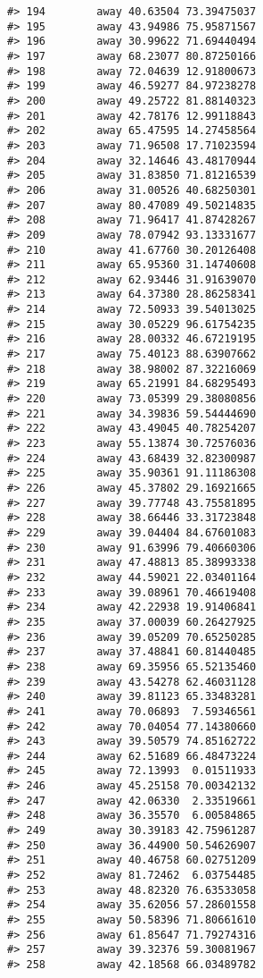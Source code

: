 \documentclass[
]{book}
\theoremstyle{definition}
\theoremstyle{definition}
\theoremstyle{definition}
\theoremstyle{definition}
\theoremstyle{remark}
\begin{document}
\begin{verbatim}
#> 194        away 40.63504 73.39475037
#> 195        away 43.94986 75.95871567
#> 196        away 30.99622 71.69440494
#> 197        away 68.23077 80.87250166
#> 198        away 72.04639 12.91800673
#> 199        away 46.59277 84.97238278
#> 200        away 49.25722 81.88140323
#> 201        away 42.78176 12.99118843
#> 202        away 65.47595 14.27458564
#> 203        away 71.96508 17.71023594
#> 204        away 32.14646 43.48170944
#> 205        away 31.83850 71.81216539
#> 206        away 31.00526 40.68250301
#> 207        away 80.47089 49.50214835
#> 208        away 71.96417 41.87428267
#> 209        away 78.07942 93.13331677
#> 210        away 41.67760 30.20126408
#> 211        away 65.95360 31.14740608
#> 212        away 62.93446 31.91639070
#> 213        away 64.37380 28.86258341
#> 214        away 72.50933 39.54013025
#> 215        away 30.05229 96.61754235
#> 216        away 28.00332 46.67219195
#> 217        away 75.40123 88.63907662
#> 218        away 38.98002 87.32216069
#> 219        away 65.21991 84.68295493
#> 220        away 73.05399 29.38080856
#> 221        away 34.39836 59.54444690
#> 222        away 43.49045 40.78254207
#> 223        away 55.13874 30.72576036
#> 224        away 43.68439 32.82300987
#> 225        away 35.90361 91.11186308
#> 226        away 45.37802 29.16921665
#> 227        away 39.77748 43.75581895
#> 228        away 38.66446 33.31723848
#> 229        away 39.04404 84.67601083
#> 230        away 91.63996 79.40660306
#> 231        away 47.48813 85.38993338
#> 232        away 44.59021 22.03401164
#> 233        away 39.08961 70.46619408
#> 234        away 42.22938 19.91406841
#> 235        away 37.00039 60.26427925
#> 236        away 39.05209 70.65250285
#> 237        away 37.48841 60.81440485
#> 238        away 69.35956 65.52135460
#> 239        away 43.54278 62.46031128
#> 240        away 39.81123 65.33483281
#> 241        away 70.06893  7.59346561
#> 242        away 70.04054 77.14380660
#> 243        away 39.50579 74.85162722
#> 244        away 62.51689 66.48473224
#> 245        away 72.13993  0.01511933
#> 246        away 45.25158 70.00342132
#> 247        away 42.06330  2.33519661
#> 248        away 36.35570  6.00584865
#> 249        away 30.39183 42.75961287
#> 250        away 36.44900 50.54626907
#> 251        away 40.46758 60.02751209
#> 252        away 81.72462  6.03754485
#> 253        away 48.82320 76.63533058
#> 254        away 35.62056 57.28601558
#> 255        away 50.58396 71.80661610
#> 256        away 61.85647 71.79274316
#> 257        away 39.32376 59.30081967
#> 258        away 42.18568 66.03489782

\end{verbatim}
\end{document}
